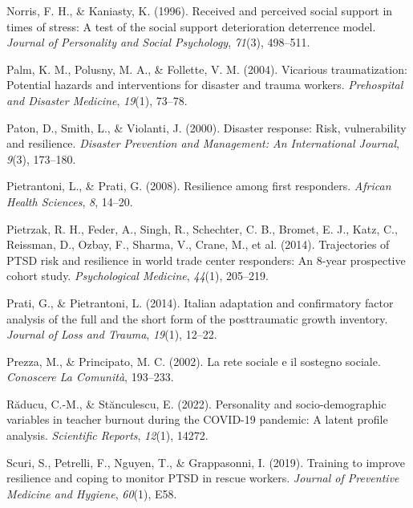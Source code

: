 \documentclass[
  man]{apa7}
\newlength{\cslhangindent}
\newlength{\cslentryspacingunit} %
\newenvironment{CSLReferences}[2] %
 {%
  \setlength{\parindent}{0pt}
  \ifodd #1
  \let\oldpar\par
  \def\par{\hangindent=\cslhangindent\oldpar}
  \fi
  \setlength{\parskip}{#2\cslentryspacingunit}
 }%
 {}
\begin{document}
\begin{CSLReferences}{1}{0}
\leavevmode{}%
Norris, F. H., \& Kaniasty, K. (1996). Received and perceived social support in times of stress: A test of the social support deterioration deterrence model. \emph{Journal of Personality and Social Psychology}, \emph{71}(3), 498--511.

\leavevmode{}%
Palm, K. M., Polusny, M. A., \& Follette, V. M. (2004). Vicarious traumatization: Potential hazards and interventions for disaster and trauma workers. \emph{Prehospital and Disaster Medicine}, \emph{19}(1), 73--78.

\leavevmode{}%
Paton, D., Smith, L., \& Violanti, J. (2000). Disaster response: Risk, vulnerability and resilience. \emph{Disaster Prevention and Management: An International Journal}, \emph{9}(3), 173--180.

\leavevmode{}%
Pietrantoni, L., \& Prati, G. (2008). Resilience among first responders. \emph{African Health Sciences}, \emph{8}, 14--20.

\leavevmode{}%
Pietrzak, R. H., Feder, A., Singh, R., Schechter, C. B., Bromet, E. J., Katz, C., Reissman, D., Ozbay, F., Sharma, V., Crane, M., et al. (2014). Trajectories of PTSD risk and resilience in world trade center responders: An 8-year prospective cohort study. \emph{Psychological Medicine}, \emph{44}(1), 205--219.

\leavevmode{}%
Prati, G., \& Pietrantoni, L. (2014). Italian adaptation and confirmatory factor analysis of the full and the short form of the posttraumatic growth inventory. \emph{Journal of Loss and Trauma}, \emph{19}(1), 12--22.

\leavevmode{}%
Prezza, M., \& Principato, M. C. (2002). La rete sociale e il sostegno sociale. \emph{Conoscere La Comunit{à}}, 193--233.

\leavevmode{}%
Răducu, C.-M., \& Stănculescu, E. (2022). Personality and socio-demographic variables in teacher burnout during the COVID-19 pandemic: A latent profile analysis. \emph{Scientific Reports}, \emph{12}(1), 14272.

\leavevmode{}%
Scuri, S., Petrelli, F., Nguyen, T., \& Grappasonni, I. (2019). Training to improve resilience and coping to monitor PTSD in rescue workers. \emph{Journal of Preventive Medicine and Hygiene}, \emph{60}(1), E58.


\end{CSLReferences}
\end{document}
